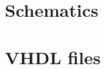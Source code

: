 \appendix
\section{Schematics}
\label{sec:schematics}

\newpage

\section{VHDL files}
\label{sec:VHDL}
